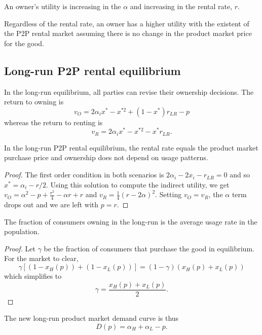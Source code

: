 \documentclass[11pt]{article}
\begin{document}
\begin{prop}
An owner's utility is increasing in the $\alpha$ and increasing in the rental rate, $r$. 
\end{prop}

\begin{prop}
Regardless of the rental rate, an owner has a higher utility with the existent of the P2P rental market assuming there is no change in the product market price for the good. 
\end{prop}

\subsection{Long-run P2P rental equilibrium} 
In the long-run equilibrium, all parties can revise their ownership decisions. 
The return to owning is 
\begin{equation}
v_{O} = 2\alpha_i x^* - x^{*2} + (1-x^*)r_{LR} - p   
\end{equation} 
whereas the return to renting is 
\begin{equation}
v_{R} = 2\alpha_i x^* - x^{*2} - x^*r_{LR}.  
\end{equation} 
\begin{prop}
In the long-run P2P rental equilibrium, the rental rate equals the product market purchase price and ownership does not depend on usage patterns.  
\end{prop}
\begin{proof} 
The first order condition in both scenarios is $2 \alpha_i - 2 x_i - r_{LR} = 0$ and so $x^* = \alpha_i - r/2$. 
Using this solution to compute the indirect utility, we get 
$v_O = \alpha ^2-p+\frac{r^2}{4}-\alpha  r+r$ and $v_R = \frac{1}{4} (r-2 \alpha )^2$. 
Setting $v_O = v_R$, the $\alpha$ term drops out and we are left with $p = r$. 
\end{proof} 

\begin{prop}
The fraction of consumers owning in the long-run is the average usage rate in the population.  
\end{prop} 
\begin{proof} 
Let $\gamma$ be the fraction of consumers that purchase the good in equilibrium. 
For the market to clear, 
\begin{equation}
\gamma \left[ (1-x_H(p)) + (1-x_L(p))\right] = (1-\gamma)\left(x_H(p) + x_L(p) \right) 
\end{equation} 
which simplifies to 
\begin{equation}
\gamma = \frac{x_H(p) + x_L(p)}{2}.  
\end{equation} 
\end{proof} 
The new long-run product market demand curve is thus
\begin{equation}
D(p) = \alpha_H + \alpha_L - p.  
\end{equation} 
\end{document}
